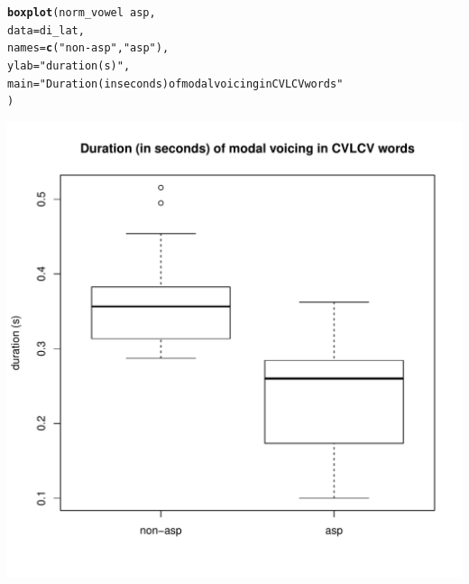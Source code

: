 \documentclass[a4paper,11pt]{article}\usepackage[]{graphicx}\usepackage[]{color}
\makeatletter
\def\maxwidth{ %
  \ifdim\Gin@nat@width>\linewidth
    \linewidth
  \else
    \Gin@nat@width
  \fi
}
\newcommand{\hlstr}[1]{\textcolor[rgb]{0.192,0.494,0.8}{#1}}%
\newcommand{\hlopt}[1]{\textcolor[rgb]{0,0,0}{#1}}%
\newcommand{\hlstd}[1]{\textcolor[rgb]{0.345,0.345,0.345}{#1}}%
\newcommand{\hlkwc}[1]{\textcolor[rgb]{0.333,0.667,0.333}{#1}}%
\newcommand{\hlkwd}[1]{\textcolor[rgb]{0.737,0.353,0.396}{\textbf{#1}}}%
\newenvironment{kframe}{%
 \def\at@end@of@kframe{}%
 \ifinner\ifhmode%
  \def\at@end@of@kframe{\end{minipage}}%
  \begin{minipage}{\columnwidth}%
 \fi\fi%
 \def\FrameCommand##1{\hskip\@totalleftmargin \hskip-\fboxsep
 \colorbox{shadecolor}{##1}\hskip-\fboxsep
     \hskip-\linewidth \hskip-\@totalleftmargin \hskip\columnwidth}%
 \MakeFramed {\advance\hsize-\width
   \@totalleftmargin\z@ \linewidth\hsize
   \@setminipage}}%
 {\par\unskip\endMakeFramed%
 \at@end@of@kframe}
\newenvironment{knitrout}{}{} %
\makeatother
\begin{document}
\begin{knitrout}
\color{fgcolor}\begin{kframe}
\begin{alltt}
\hlkwd{boxplot}\hlstd{(norm_vowel} \hlopt{~} \hlstd{asp,}
        \hlkwc{data} \hlstd{= di_lat,}
        \hlkwc{names} \hlstd{=} \hlkwd{c}\hlstd{(}\hlstr{"non-asp"}\hlstd{,} \hlstr{"asp"}\hlstd{),}
        \hlkwc{ylab} \hlstd{=} \hlstr{"duration (s)"}\hlstd{,}
        \hlkwc{main} \hlstd{=} \hlstr{"Duration (in seconds) of modal voicing in CVLCV words"}
        \hlstd{)}
\end{alltt}
\end{kframe}
\includegraphics[width=\maxwidth]{img/bi-lat-box-1} 

\end{knitrout}
\end{document}
